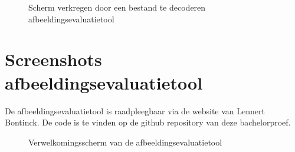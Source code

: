 \begin{figure}[h!]
	\caption{Scherm verkregen door een bestand te decoderen \gls{afbeeldingsevaluatietool}}
	\label{fig:bijlages-screenshot-datacompressietool-decoded}
\end{figure}

\section{Screenshots afbeeldingsevaluatietool}
\label{sec:bijlages-screenshot-afbeeldingsevaluatietool}

De \gls{afbeeldingsevaluatietool} is raadpleegbaar via de website van Lennert Bontinck. De code is te vinden op de \gls{github} repository van deze bachelorproef.

\begin{figure}[h!]
	\caption{Verwelkomingsscherm van de \gls{afbeeldingsevaluatietool}}
	\label{fig:bijlages-screenshot-afbeeldingsevaluatietool-welkom}
\end{figure}

